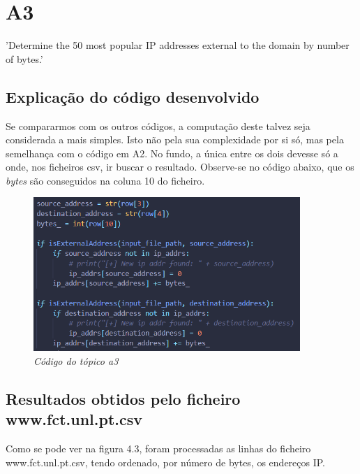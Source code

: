 \chapter{A3}

{\LARGE 'Determine the 50 most popular IP addresses external to the domain by number of bytes.'}

\section{Explicação do código desenvolvido}

Se compararmos com os outros códigos, a computação deste talvez seja considerada a mais simples. Isto não pela sua complexidade por si só, mas pela semelhança com o código em A2. No fundo, a única entre os dois devesse só a onde, nos ficheiros csv, ir buscar o resultado. Observe-se no código abaixo, que os \textit{bytes} são conseguidos na coluna 10 do ficheiro.

\begin{figure}[h!]
    \label{high}
    \centering
    \includegraphics[width=0.9\textwidth]{Images/a3/a3.png}
    \caption{\textit{Código do tópico a3}}
\end{figure}


\newpage

\section{Resultados obtidos pelo ficheiro www.fct.unl.pt.csv}

Como  se  pode  ver  na  figura  4.3,  foram  processadas  as  linhas do ficheiro www.fct.unl.pt.csv, tendo ordenado, por número de bytes, os endereços IP.

